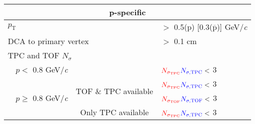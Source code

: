 \documentclass[ALICE,manyauthors]{cernphprep}
\newcommand{\Lam}{$\Lambda$\xspace}
\begin{document}
\begin{table}[htbp]
\begin{tabular}{lc|c|l}
   
   \multicolumn{4}{c}{p-specific} \\
   \hline
   \multicolumn{3}{l|}{$p_{\mathrm{T}}$} & $ > $ 0.5(p) [0.3($\overline{\mathrm{p}}$)] GeV/\textit{c} \\
   \hline
   \multicolumn{3}{l|}{DCA to primary vertex} & $>$ 0.1 cm \\
   \hline
   \multicolumn{4}{l}{TPC and TOF $N_{\sigma}$} \\
   \cline{2-4}
    & \multicolumn{1}{c}{$p <$ 0.8 GeV/\textit{c}} & & ${\color{red}N_{\sigma_{\mathrm{TPC}}}}{\color{blue}N_{\sigma, \mathrm{TPC}}} <$ 3 \\
   \cline{2-4}
    & \multicolumn{1}{c}{\multirow{3}{*}{$p \geq$ 0.8 GeV/\textit{c}}} &  \multirow{2}{*}{TOF \& TPC available} & ${\color{red}N_{\sigma_{\mathrm{TPC}}}}{\color{blue}N_{\sigma, \mathrm{TPC}}} <$ 3 \\
    & \multicolumn{2}{c|}{} & ${\color{red}N_{\sigma_{\mathrm{TOF}}}}{\color{blue}N_{\sigma, \mathrm{TOF}}} <$ 3 \\
   \cline{3-4}
    & \multicolumn{1}{c}{} & Only TPC available & ${\color{red}N_{\sigma_{\mathrm{TPC}}}}{\color{blue}N_{\sigma, \mathrm{TPC}}} <$ 3 \\
   \hline   
  \end{tabular}
 \label{tab:LamCuts} 
\end{table}
\end{document}
